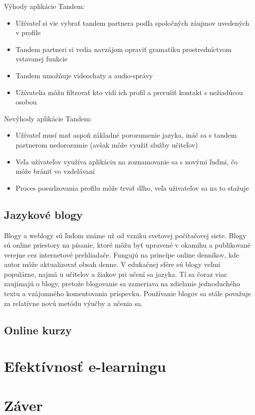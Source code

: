 \documentclass[10pt,oneside,slovak,a4paper]{article}
\begin{document}
Výhody aplikácie Tandem: 
\begin{itemize}
\item Užívateľ si vie vybrať tandem partnera podľa spoločných záujmov uvedených v profile \cite{tandem}
\item Tandem partneri si vedia navzájom opraviť gramatiku prostredníctvom vstavanej funkcie
\item Tandem umožňuje videochaty \cite{tandem} a audio-správy
\item Užívatelia môžu filtrovať kto vidí ich profil a prerušiť kontakt s nežiadúcou osobou \cite{tandem}
\end{itemize}

Nevýhody aplikácie Tandem:
\begin{itemize}
\item Užívateľ musí mať aspoň základné porozumenie jazyka, ináč sa s tandem partnerom nedorozumie (avšak môže využiť služby učiteľov) \cite{tandem}
\item Veľa užívateľov využíva aplikáciu na zoznamovanie sa s novými ľuďmi, čo môže brániť vo vzdelávaní \cite{tandem}
\item Proces posudzovania profilu môže trvať dlho, veľa uživateľov sa na to sťažuje \cite{tandem}
\end{itemize}

\subsection{Jazykové blogy} %
Blogy a weblogy sú ľuďom známe už od vzniku svetovej počítačovej siete. Blogy sú online priestory na písanie, ktoré môžu byť upravené v okamihu a publikované verejne cez internetové prehliadače. Fungujú na princípe online denníkov, kde autor môže aktualizovať obsah denne. V edukačnej sfére sú blogy veľmi  populárne, najmä u učitelov a žiakov pri učení sa jazyka. Tí sa čoraz viac zaujímajú o blogy, pretože blogovanie sa zameriava na zdielanie jednoduchého textu a vzájomného komentovania príspevku. Používanie blogov sa stále považuje za relatívne novú metódu výučby a učenia sa. \cite{blog-mif}
\subsection{Online kurzy}

\section{Efektívnosť e-learningu}

\cite{duolingo}
\cite{efektivnost}
\section{Záver}



\end{document}
